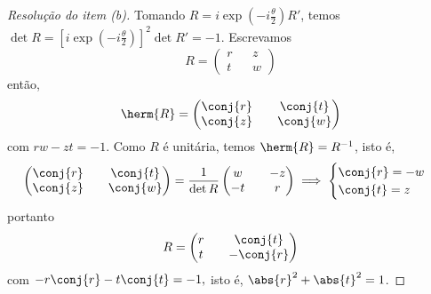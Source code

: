 \begin{proof}[Resolução do item (b)]
    Tomando \(R = i \exp\left(-i\frac{\theta}{2}\right) R'\), temos \(\det{R} = \left[i \exp\left(-i\frac{\theta}{2}\right)\right]^2\det{R'} = -1\). Escrevamos
    \begin{equation*}
        R = \begin{pmatrix}
            r && z\\
            t && w
        \end{pmatrix}
    \end{equation*}
    então,
    \begin{equation*}
        \herm{R} = \begin{pmatrix}
            \conj{r} && \conj{t}\\
            \conj{z} && \conj{w}
        \end{pmatrix}
    \end{equation*}
    com \(rw - zt = -1\). Como \(R\) é unitária, temos \(\herm{R} = R^{-1}\), isto é,
    \begin{equation*}
        \begin{pmatrix}
            \conj{r} && \conj{t}\\
            \conj{z} && \conj{w}
        \end{pmatrix} =
        \frac{1}{\det{R}}\begin{pmatrix}
            w && -z\\
            -t && r
        \end{pmatrix} \implies
        \begin{cases}
            \conj{r} = -w\\
            \conj{t} = z
        \end{cases}
    \end{equation*}
    portanto
    \begin{equation*}
        R = \begin{pmatrix}
            r && \conj{t}\\
            t && - \conj{r}
        \end{pmatrix}
    \end{equation*}
    com \(-r\conj{r} - t\conj{t} = -1,\) isto é, \(\abs{r}^2 + \abs{t}^2 = 1\).
\end{proof}
